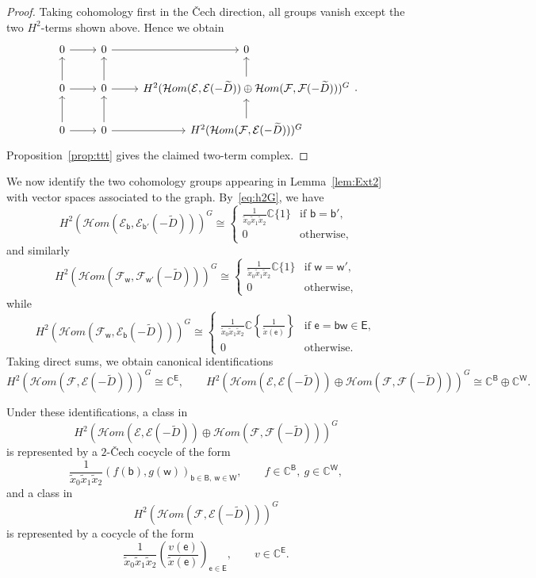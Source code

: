 \documentclass[dvipsnames,11pt]{article}
\theoremstyle{definition}
\newcommand{\C}{{\mathbb C}}
\def\B{\mathsf B}
\def\W{\mathsf W}
\def\w{\mathsf w}
\def\b{\mathsf b}
\def\e{\mathsf e}
\def\E{\mathsf E}
\def\cale{\mathcal E}
\def\calf{\mathcal F}
\begin{document}
\begin{proof}
Taking cohomology first in the \v Cech direction, all groups vanish except the two \(H^2\)-terms shown above. Hence we obtain
\[
\begin{tikzcd}
0 \arrow[r] & 0 \arrow[r] & 0 \\
0 \arrow[u] \arrow[r] & 0 \arrow[u] \arrow[r] &
H^2(\mathcal H om(\cale,\cale(-\widetilde D))\oplus \mathcal H om(\calf,\calf(-\widetilde D)))^G \arrow[u]\\
0 \arrow[u] \arrow[r] & 0 \arrow[u] \arrow[r] &
H^2(\mathcal H om(\calf,\cale(-\widetilde D)))^G \arrow[u]
\end{tikzcd}.
\]
Proposition~\ref{prop:ttt} gives the claimed two-term complex.
\end{proof}

We now identify the two cohomology groups appearing in Lemma~\ref{lem:Ext2} with vector spaces associated to the graph. By~\eqref{eq:h2G}, we have
\[
H^2(\mathcal H om(\cale_\b,\cale_{\b'}(-\widetilde D)))^G
\cong
\begin{cases}
\frac{1}{\widetilde x_0 \widetilde x_1 \widetilde x_2}\C\{1\} & \text{if $\b=\b'$},\\
0 & \text{otherwise},
\end{cases}
\]
and similarly
\[
H^2(\mathcal H om(\calf_\w,\calf_{\w'}(-\widetilde D)))^G
\cong
\begin{cases}
\frac{1}{\widetilde x_0 \widetilde x_1 \widetilde x_2}\C\{1\} & \text{if $\w=\w'$},\\
0 & \text{otherwise},
\end{cases}
\]
while
\[
H^2(\mathcal H om(\calf_\w,\cale_\b(-\widetilde D)))^G
\cong
\begin{cases}
\frac{1}{\widetilde x_0 \widetilde x_1 \widetilde x_2}\C\!\left\{\frac{1}{\widetilde x(\e)}\right\} & \text{if $\e=\b\w\in \E$},\\
0 & \text{otherwise}.
\end{cases}
\]
Taking direct sums, we obtain canonical identifications
\begin{equation}\label{eq:concrete-vs-trace}
H^2(\mathcal H om(\calf,\cale(-\widetilde D)))^G \cong \C^{\E},
\qquad
H^2(\mathcal H om(\cale,\cale(-\widetilde D))\oplus \mathcal H om(\calf,\calf(-\widetilde D)))^G
\cong \C^{\B}\oplus \C^{\W}.
\end{equation}

Under these identifications, a class in
\[
H^2(\mathcal H om(\cale,\cale(-\widetilde D))\oplus \mathcal H om(\calf,\calf(-\widetilde D)))^G
\]
is represented by a \(2\)-\v Cech cocycle of the form
\[
\frac{1}{\widetilde x_0 \widetilde x_1 \widetilde x_2}(f(\b),g(\w))_{\b\in\B,\ \w\in\W},
\qquad
f\in \C^\B,\ g\in \C^\W,
\]
and a class in
\[
H^2(\mathcal H om(\calf,\cale(-\widetilde D)))^G
\]
is represented by a cocycle of the form
\[
\frac{1}{\widetilde x_0 \widetilde x_1 \widetilde x_2}
\left(
\frac{v(\e)}{\widetilde x(\e)}
\right)_{\e\in\E},
\qquad
v\in \C^\E.
\]
\end{document}
